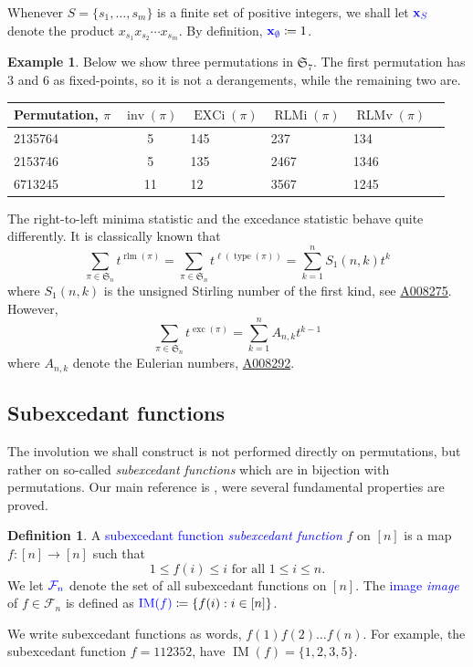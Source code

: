 \documentclass[reqno]{amsart}
\theoremstyle{definition}
\newtheorem{definition}[theorem]{Definition}
\newtheorem{example}[theorem]{Example}
\newcommand{\stirlingOne}[2]{{S_1(#1,#2)}}
\newcommand{\defin}[1]{%
\relax\ifmmode%
\textcolor{blue}{#1}%
\else\textcolor{blue}{\emph{#1}}%
\fi%
}
\newcommand{\oeis}[1]{\href{http://oeis.org/#1}{#1}}
\newcommand{\xvec}{\mathbf{x}}
\newcommand{\symS}{\mathfrak{S}}
\newcommand{\SEF}{\mathcal{F}}  %
\DeclareMathOperator{\inv}{inv}
\DeclareMathOperator{\type}{type}
\DeclareMathOperator{\length}{\ell}
\DeclareMathOperator{\exc}{exc}
\DeclareMathOperator{\EXCi}{EXCi}
\DeclareMathOperator{\rlm}{rlm}
\DeclareMathOperator{\RLMv}{RLMv}
\DeclareMathOperator{\RLMi}{RLMi}
\DeclareMathOperator{\supp}{IM}
\begin{document}
Whenever $S = \{s_1,\dotsc,s_m\}$ is a finite set of positive integers,
we shall let $\defin{\xvec_S}$ denote the product $x_{s_1}x_{s_2}\dotsm x_{s_m}$.
By definition, $\defin{\xvec_\emptyset} \coloneqq 1$.


\begin{example}
Below we show three permutations in $\symS_7$.
The first permutation has $3$ and $6$ as fixed-points, so it is not a derangements,
while the remaining two are.
\begin{center}
 \begin{tabular}{l c llll}
  Permutation, $\pi$ & $\inv(\pi)$ & $\EXCi(\pi)$ &  $\RLMi(\pi)$ & $\RLMv(\pi)$  \\
  \midrule 
 2135764 & 5 & 145 & 237 & 134  \\
 2153746 & 5 & 135 & 2467 & 1346  \\
 6713245 & 11 & 12 & 3567 & 1245 
 \end{tabular}
\end{center}
\end{example}

The right-to-left minima statistic and the excedance statistic 
behave quite differently. It is classically known that
\[
   \sum_{\pi \in \symS_n} t^{\rlm(\pi)} = 
   \sum_{\pi \in \symS_n} t^{\length(\type(\pi))} =
   \sum_{k=1}^n \stirlingOne{n}{k} t^k 
\]
where $\stirlingOne{n}{k}$ is the unsigned Stirling number of the first kind,
see \oeis{A008275}.
%
However,
\[
 \sum_{\pi \in \symS_n} t^{\exc(\pi)} = 
 \sum_{k=1}^{n} A_{n,k} t^{k-1} 
\]
where $A_{n,k}$ denote the Eulerian numbers, \oeis{A008292}.


\subsection{Subexcedant functions}

The involution we shall construct is not performed directly on permutations,
but rather on so-called \emph{subexcedant functions} which are in bijection with permutations.
Our main reference is \cite{MantaciRakotondrajao2001},
were several fundamental properties are proved.
%
\begin{definition}\label{subex}
	A \defin{subexcedant function}  $f$ on $[n]$ is a map $f : [n] \longrightarrow [n]$
	such that
	\begin{equation*}
		1\leq f(i)\leq i \text{ for all } 1\leq i\leq n.
	\end{equation*}
	We let $\defin{\SEF_n}$ denote the set of all 
	subexcedant functions on $[n]$. 
	The \defin{image} of $f \in \SEF_n$ is defined as
	$\defin{\supp(f)} \coloneqq \{ f(i) : i \in [n] \}$.
\end{definition}
We write subexcedant functions as words, $f(1)f(2)\dotsc f(n)$.
For example, the subexcedant function $f=112352$, have $\supp(f)=\{1,2,3,5\}$.
\end{document}
